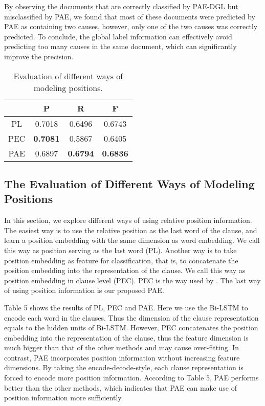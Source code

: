 \documentclass[letterpaper]{article} \usepackage{aaai19}  \usepackage{times}  \usepackage{helvet}  \usepackage{courier}  \usepackage{url}  \usepackage{graphicx}  \frenchspacing  \setlength{\pdfpagewidth}{8.5in}  \setlength{\pdfpageheight}{11in}  \setcounter{secnumdepth}{0}
\begin{document}
By observing the documents that are correctly classified by PAE-DGL but misclassified by PAE, we found that most of these documents were predicted by PAE as containing two causes, however, only one of the two causes was correctly predicted. To conclude, the global label information can effectively avoid predicting too many causes in the same document, which can significantly improve the precision.

\begin{table}
	
	\centering
	\caption{\label{font-table} Evaluation of different ways of modeling positions. }
	\begin{tabular} {c|c|c|c}
		\hline    & P & R & F\\
		\hline
		PL & 0.7018 & 0.6496 & 0.6743 \\
		PEC & \textbf{0.7081} & 0.5867 & 0.6405 \\
		PAE & 0.6897 & \textbf{0.6794} & \textbf{0.6836} \\
		\hline
	\end{tabular}
	\label{tab:table1}
\end{table}


\subsection{The Evaluation of Different Ways of Modeling Positions}

In this section, we explore different ways of using relative position information. The easiest way is to use the relative position as the last word of the clause, and learn a position embedding with the same dimension as word embedding. We call this way as position serving as the last word (PL). Another way is to take position embedding as feature for classification, that is, to concatenate the position embedding into the representation of the clause. We call this way as position embedding in clause level (PEC). PEC is the way used by \cite{gui2016event,gui2017question,xu2017ensemble}. The last way of using position information is our proposed PAE.



Table 5 shows the results of PL, PEC and PAE. Here we use the Bi-LSTM to encode each word in the clauses. Thus the dimension of the clause representation equals to the hidden units of Bi-LSTM. However, PEC concatenates the position embedding into the representation of the clause, thus the feature dimension is much bigger than that of the other methods and may cause over-fitting. In contrast, PAE incorporates position information without increasing feature dimensions. By taking the encode-decode-style, each clause representation is forced to encode more position information. According to Table 5, PAE performs better than the other methods, which indicates that PAE can make use of position information more sufficiently.
\end{document}
